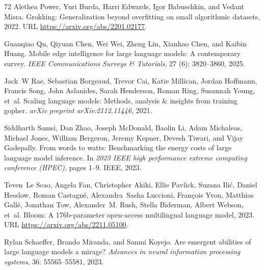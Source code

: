 \begin{thebibliography}{72}
Alethea Power, Yuri Burda, Harri Edwards, Igor Babuschkin, and Vedant Misra.
\newblock Grokking: Generalization beyond overfitting on small algorithmic datasets, 2022.
\newblock URL \url{https://arxiv.org/abs/2201.02177}.

Guanqiao Qu, Qiyuan Chen, Wei Wei, Zheng Lin, Xianhao Chen, and Kaibin Huang.
\newblock Mobile edge intelligence for large language models: A contemporary survey.
\newblock \emph{IEEE Communications Surveys \& Tutorials}, 27 (6): 3820--3860, 2025.

Jack~W Rae, Sebastian Borgeaud, Trevor Cai, Katie Millican, Jordan Hoffmann, Francis Song, John Aslanides, Sarah Henderson, Roman Ring, Susannah Young, et~al.
\newblock Scaling language models: Methods, analysis \& insights from training gopher.
\newblock \emph{arXiv preprint arXiv:2112.11446}, 2021.

Siddharth Samsi, Dan Zhao, Joseph McDonald, Baolin Li, Adam Michaleas, Michael Jones, William Bergeron, Jeremy Kepner, Devesh Tiwari, and Vijay Gadepally.
\newblock From words to watts: Benchmarking the energy costs of large language model inference.
\newblock In \emph{2023 IEEE high performance extreme computing conference (HPEC)}, pages 1--9. IEEE, 2023.

Teven~Le Scao, Angela Fan, Christopher Akiki, Ellie Pavlick, Suzana Ilić, Daniel Hesslow, Roman Castagné, Alexandra~Sasha Luccioni, François Yvon, Matthias Gallé, Jonathan Tow, Alexander~M. Rush, Stella Biderman, Albert Webson, et~al.
\newblock Bloom: A 176b-parameter open-access multilingual language model, 2023.
\newblock URL \url{https://arxiv.org/abs/2211.05100}.

Rylan Schaeffer, Brando Miranda, and Sanmi Koyejo.
\newblock Are emergent abilities of large language models a mirage?
\newblock \emph{Advances in neural information processing systems}, 36: 55565--55581, 2023.


\end{thebibliography}
